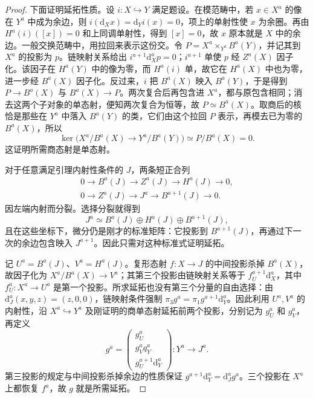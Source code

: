 \begin{proof}
	下面证明延拓性质。设 \(i:X\hookrightarrow Y\) 满足题设。在模范畴中，若 \(x\in X^a\) 的像在 \(Y^a\) 中成为余边，则 \(i(\mathrm d_Xx)=\mathrm d_Yi(x)=0\)，项上的单射性使 \(x\) 为余圈。再由 \(H^a(i)([x])=0\) 和上同调单射性，得到 \([x]=0\)，故 \(x\) 原本就是 \(X\) 中的余边。一般交换范畴中，用拉回来表示这份交。令 \(P=X^a\times_{Y^a}B^a(Y)\)，并记其到 \(X^a\) 的投影为 \(p\)。链映射关系给出 \(i^{a+1}\mathrm{d}_X^ap=0\)；\(i^{a+1}\) 单使 \(p\) 经 \(Z^a(X)\) 因子化。该因子在 \(H^a(Y)\) 中的像为零，而 \(H^a(i)\) 单，故它在 \(H^a(X)\) 中也为零，进一步经 \(B^a(X)\) 因子化。反过来，\(i\) 把 \(B^a(X)\) 映入 \(B^a(Y)\)，于是得到 \(P\to B^a(X)\) 与 \(B^a(X)\to P\)。两次复合后再包含进 \(X^a\)，都与原包含相同；消去这两个子对象的单态射，便知两次复合为恒等，故 \(P\simeq B^a(X)\)。取商后的核恰是那些在 \(Y^a\) 中落入 \(B^a(Y)\) 的类，它们由这个拉回 \(P\) 表示，再模去已为零的 \(B^a(X)\)，所以
	\[
		\ker\bigl(X^a/B^a(X)\longrightarrow Y^a/B^a(Y)\bigr) \simeq P/B^a(X)=0.
	\]
	这证明所需商态射是单态射。

	对于任意满足引理内射性条件的 \(J\)，两条短正合列
	\[
		\begin{gathered}
			0\longrightarrow B^a(J)\longrightarrow Z^a(J) \longrightarrow H^a(J)\longrightarrow0,\\
			0\longrightarrow Z^a(J)\longrightarrow J^a \longrightarrow B^{a+1}(J)\longrightarrow0.
		\end{gathered}
	\]
	因左端内射而分裂。选择分裂就得到
	\[
		J^a\simeq B^a(J)\oplus H^a(J)\oplus B^{a+1}(J),
	\]
	且在这些坐标下，微分仍是刚才的标准矩阵：它投影到 \(B^{a+1}(J)\)，再通过下一次的余边包含映入 \(J^{a+1}\)。因此只需对这种标准式证明延拓。

	记 \(U^a=B^a(J)\)、\(V^a=H^a(J)\)。复形态射 \(f:X\to J\) 的中间投影杀掉 \(B^a(X)\)，故因子化为 \(X^a/B^a(X)\to V^a\)；其第三个投影由链映射关系等于 \(f_U^{a+1}\mathrm{d}_X^a\)，其中 \(f_U^a:X^a\to U^a\) 是第一个投影。所求延拓也没有第三个分量的自由选择：由 \(\mathrm d_J^a(x,y,z)=(z,0,0)\)，链映射条件强制 \(\pi_3g^a=\pi_1g^{a+1}\mathrm d_Y^a\)。因此利用 \(U^a,V^a\) 的内射性，沿 \(X^a\hookrightarrow Y^a\) 及刚证明的商单态射延拓前两个投影，分别记为 \(g_U^a\) 和 \(g_V^a\)，再定义
	\[
		g^a=\begin{pmatrix}
			g_U^a\\g_V^a q_Y^a\\g_U^{a+1}\mathrm{d}_Y^a
		\end{pmatrix}:Y^a\longrightarrow J^a.
	\]
	第三投影的规定与中间投影杀掉余边的性质保证 \(g^{a+1}\mathrm{d}_Y^a=\mathrm{d}_J^ag^a\)。三个投影在 \(X^a\) 上都恢复 \(f^a\)，故 \(g\) 就是所需延拓。
\end{proof}

